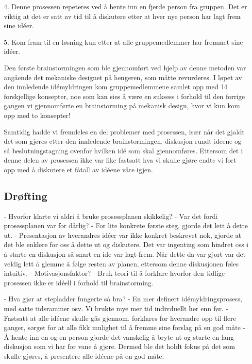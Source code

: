 4. Denne prosessen repeteres ved å hente inn en fjerde person fra gruppen. Det er viktig at det er satt av tid til å diskutere etter at hver nye person har lagt frem sine idéer.\newline

5. Kom fram til en løsning kun etter at alle gruppemedlemmer har fremmet sine idéer.\newline

Den første brainstormingen som ble gjennomført ved hjelp av denne metoden var angående det mekaniske designet på hengeren, som måtte revurderes. I løpet av den innledende idémyldringen kom gruppemedlemmene samlet opp med 14 forskjellige konsepter, noe som kan sies å være en suksess i forhold til den forrige gangen vi gjennomførte en brainstorming på mekanisk design, hvor vi kun kom opp med to konsepter!

Samtidig hadde vi fremdeles en del problemer med prosessen, især når det gjaldt det som gjøres etter den innledende brainstormingen, diskusjon rundt ideene og så beslutningstagning ovenfor hvilken idé som skal gjennomføres. Ettersom det i denne delen av prosessen ikke var like fastsatt hva vi skulle gjøre endte vi fort opp med å diskutere et fåtall av idéene våre igjen.

\subsection{Drøfting}
- Hvorfor klarte vi aldri å bruke prosessplanen skikkelig?
- Var det fordi prosessplanen var for dårlig?
- For lite konkrete første steg, gjorde det lett å dette ut.
- Presentasjon av hverandres idéer var ikke konkret beskrevet nok, gjorde at det ble enklere for    oss å dette ut og diskutere. Det var ingenting som hindret oss i å starte en diskusjon så snart en ide var lagt frem. Når dette da var gjort var det veldig lett å glemme å følge resten av planen, ettersom denne diskusjonen føles intuitiv.
- Motivasjonsfaktor?
- Bruk teori til å forklare hvorfor den tidlige prosessen ikke er idéell i forhold til brainstorming.\newline

- Hva gjør at stepladder fungerte så bra?
- En mer definert idémyldringsprosess, med satte tidsrammer osv. Vi brukte mye mer tid indivduellt her enn før. 
- Fastsatt at alle idéene skulle gås gjennom, forklares for hverandre opp til flere ganger, sørget for at alle fikk mulighet til å fremme sine forslag på en god måte
- Å hente inn en og en person gjorde det vanskelig å bryte ut og starte en lang diskusjon som vi har for vane å gjøre. Dermed ble det holdt fokus på det som skulle gjøres, å presentere alle idéene på en god måte.

